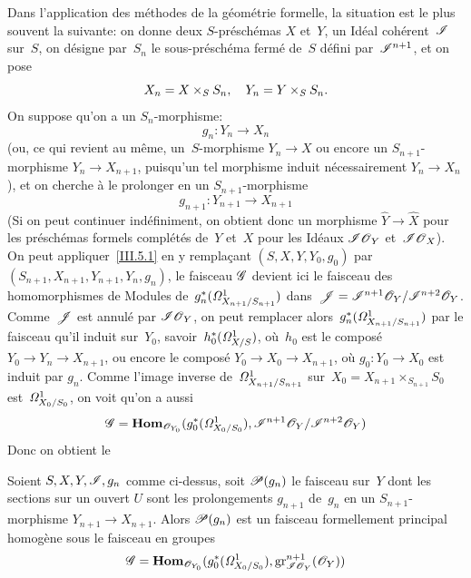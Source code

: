 Dans l'application des m\'ethodes de la g\'eom\'etrie formelle,
la situation est le plus souvent la suivante: on donne deux
$S$-pr\'esch\'emas $X$ et~$Y$, un Id\'eal coh\'erent~$\cal{I}$
sur~$S$, on d\'esigne par~$S_n$ le sous-pr\'esch\'ema ferm\'e
de~$S$ d\'efini par~$\cal{I}^{n+1}$, et on pose
\begin{equation*}
X_n=X\times_S S_n \quoi,\quad Y_n=Y\times_S S_n.
\end{equation*}
On suppose qu'on a un $S_n$-morphisme:
\begin{equation*}
g_n\colon Y_n\to X_n
\end{equation*}
(ou, ce qui revient au m\^eme, un~$S$-morphisme $Y_n\to X$ ou encore
un $S_{n+1}$-morphisme $Y_n\to X_{n+1}$,
puisqu'un
tel morphisme
induit n\'ecessairement $Y_n\to X_n$), et on cherche \`a le
prolonger en un $S_{n+1}$-morphisme
\begin{equation*}
g_{n+1}\colon Y_{n+1}\to X_{n+1}
\end{equation*}
(Si on peut continuer ind\'efiniment, on obtient donc un morphisme
$\widehat{Y}\to\widehat{X}$ pour les pr\'esch\'emas formels
compl\'et\'es de~$Y$ et~$X$ pour les Id\'eaux
$\cal{IO}_Y$ et~$\cal{IO}_X$).
On peut appliquer~\ref{III.5.1} en y rempla\c cant $(S,X,Y,Y_0,g_0)$
par $(S_{n+1},X_{n+1},Y_{n+1},Y_n,g_n)$, le faisceau $\cal{G}$ devient
ici le faisceau des homomorphismes de Modules
de~$g_n^*(\it{\Omega}_{X_{n+1}/S_{n+1}}^1)$
dans~$\cal{J}=\cal{I}^{n+1}\cal{O}_Y/\cal{I}^{n+2}\cal{O}_Y$.
Comme~$\cal{J}$ est annul\'e par $\cal{IO}_Y$, on peut remplacer
alors~$g_n^*(\it{\Omega}_{X_{n+1}/S_{n+1}}^1)$
par le faisceau qu'il induit sur~$Y_0$,
savoir~$h_0^*(\it{\Omega}_{X/S}^1)$, o\`u~$h_0$ est le compos\'e
$Y_0\to Y_n\to X_{n+1}$, ou encore le compos\'e $Y_0 \to X_0\to
X_{n+1}$, o\`u $g_0\colon Y_0\to X_0$ est induit par $g_n$. Comme
l'image inverse de~$\it{\Omega}_{X_{n+1}/S_{n+1}}^1$
sur~$X_0=X_{n+1}\times_{S_{n+1}}S_0$
est~$\it{\Omega}_{X_{0}/S_{0}}^1$, on voit qu'on a aussi
\begin{equation*}
\cal{G}=\SheafHom_{\cal{O}_{Y_0}} (g_0^*(\it{\Omega}_{X_0/S_0}^1),
\cal{I}^{n+1}\cal{O}_Y/\cal{I}^{n+2}\cal{O}_Y)
\end{equation*}
Donc on obtient le

\begin{corollaire}
\label{III.5.3}
Soient $S,X,Y,\cal{I},g_n$ comme ci-dessus, soit $\cal{P}(g_n)$ le
faisceau sur~$Y$ dont les sections sur un ouvert $U$ sont les
prolongements $g_{n+1}$ de~$g_n$ en un $S_{n+1}$-morphisme $Y_{n+1}\to
X_{n+1}$. Alors
$\cal{P}(g_{n})$
est un faisceau formellement principal homog\`ene sous le faisceau
en groupes
\begin{equation*}
\cal{G}=\SheafHom_{\cal{O}_{Y_0}} (g_0^*(\it{\Omega}_{X_0/S_0}^1),
\gr_{\cal{IO}_Y}^{n+1}(\cal{O}_Y))
\end{equation*}
\end{corollaire}

